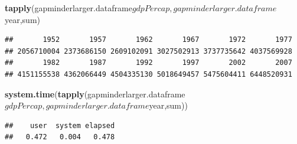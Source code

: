 \documentclass[]{article}
\newenvironment{Shaded}{\begin{snugshade}}{\end{snugshade}}
\newcommand{\KeywordTok}[1]{\textcolor[rgb]{0.13,0.29,0.53}{\textbf{{#1}}}}
\newcommand{\NormalTok}[1]{{#1}}
\begin{document}
\begin{Shaded}
\begin{Highlighting}[]
\KeywordTok{tapply}\NormalTok{(gapminderlarger.dataframe$gdpPercap,gapminderlarger.dataframe$year,sum)}
\end{Highlighting}
\end{Shaded}

\begin{verbatim}
##       1952       1957       1962       1967       1972       1977 
## 2056710004 2373686150 2609102091 3027502913 3737735642 4037569928 
##       1982       1987       1992       1997       2002       2007 
## 4151155538 4362066449 4504335130 5018649457 5475604411 6448520931
\end{verbatim}

\begin{Shaded}
\begin{Highlighting}[]
\KeywordTok{system.time}\NormalTok{(}\KeywordTok{tapply}\NormalTok{(gapminderlarger.dataframe$gdpPercap,gapminderlarger.dataframe$year,sum))}
\end{Highlighting}
\end{Shaded}

\begin{verbatim}
##    user  system elapsed 
##   0.472   0.004   0.478
\end{verbatim}
\end{document}
